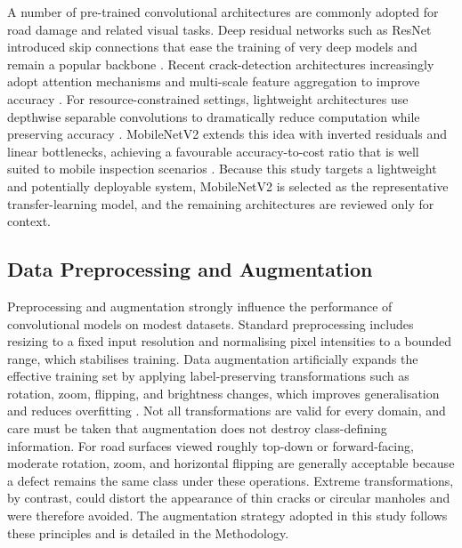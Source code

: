 \documentclass[preprint,12pt]{elsarticle}
\begin{document}
A number of pre-trained convolutional architectures are commonly adopted for road damage and related visual tasks.
Deep residual networks such as ResNet introduced skip connections that ease the training of very deep models and remain a popular backbone \cite{he2016deep}.
Recent crack-detection architectures increasingly adopt attention mechanisms and multi-scale feature aggregation to improve accuracy \cite{qi2023gmdnet, wang2024crackms}.
For resource-constrained settings, lightweight architectures use depthwise separable convolutions to dramatically reduce computation while preserving accuracy \cite{liu2024pavement}.
MobileNetV2 extends this idea with inverted residuals and linear bottlenecks, achieving a favourable accuracy-to-cost ratio that is well suited to mobile inspection scenarios \cite{sandler2018mobilenetv2}.
Because this study targets a lightweight and potentially deployable system, MobileNetV2 is selected as the representative transfer-learning model, and the remaining architectures are reviewed only for context.

\subsection{Data Preprocessing and Augmentation}

Preprocessing and augmentation strongly influence the performance of convolutional models on modest datasets.
Standard preprocessing includes resizing to a fixed input resolution and normalising pixel intensities to a bounded range, which stabilises training.
Data augmentation artificially expands the effective training set by applying label-preserving transformations such as rotation, zoom, flipping, and brightness changes, which improves generalisation and reduces overfitting \cite{xu2023haar}.
Not all transformations are valid for every domain, and care must be taken that augmentation does not destroy class-defining information.
For road surfaces viewed roughly top-down or forward-facing, moderate rotation, zoom, and horizontal flipping are generally acceptable because a defect remains the same class under these operations.
Extreme transformations, by contrast, could distort the appearance of thin cracks or circular manholes and were therefore avoided.
The augmentation strategy adopted in this study follows these principles and is detailed in the Methodology.
\end{document}
